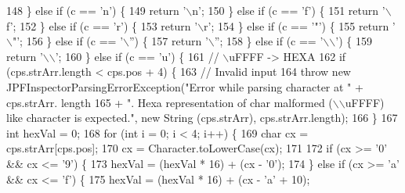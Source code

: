 \begin{DoxyCode}
148       \} \textcolor{keywordflow}{else} \textcolor{keywordflow}{if} (c == \textcolor{charliteral}{'n'}) \{
149         \textcolor{keywordflow}{return} \textcolor{charliteral}{'\(\backslash\)n'};
150       \} \textcolor{keywordflow}{else} \textcolor{keywordflow}{if} (c == \textcolor{charliteral}{'f'}) \{
151         \textcolor{keywordflow}{return} \textcolor{charliteral}{'\(\backslash\)f'};
152       \} \textcolor{keywordflow}{else} \textcolor{keywordflow}{if} (c == \textcolor{charliteral}{'r'}) \{
153         \textcolor{keywordflow}{return} \textcolor{charliteral}{'\(\backslash\)r'};
154       \} \textcolor{keywordflow}{else} \textcolor{keywordflow}{if} (c == \textcolor{charliteral}{'"'}) \{
155         \textcolor{keywordflow}{return} \textcolor{charliteral}{'\(\backslash\)"'};
156       \} \textcolor{keywordflow}{else} \textcolor{keywordflow}{if} (c == \textcolor{charliteral}{'\(\backslash\)''}) \{
157         \textcolor{keywordflow}{return} \textcolor{charliteral}{'\(\backslash\)''};
158       \} \textcolor{keywordflow}{else} \textcolor{keywordflow}{if} (c == \textcolor{charliteral}{'\(\backslash\)\(\backslash\)'}) \{
159         \textcolor{keywordflow}{return} \textcolor{charliteral}{'\(\backslash\)\(\backslash\)'};
160       \} \textcolor{keywordflow}{else} \textcolor{keywordflow}{if} (c == \textcolor{charliteral}{'u'}) \{
161         \textcolor{comment}{// \(\backslash\)uFFFF -> HEXA}
162         \textcolor{keywordflow}{if} (cps.strArr.length < cps.pos + 4) \{
163           \textcolor{comment}{// Invalid input}
164           \textcolor{keywordflow}{throw} \textcolor{keyword}{new} JPFInspectorParsingErrorException(\textcolor{stringliteral}{"Error while parsing character at "} + cps.strArr.
      length
165               + \textcolor{stringliteral}{". Hexa representation of char malformed (\(\backslash\)\(\backslash\)uFFFF) like character is expected."}, \textcolor{keyword}{new} String
      (cps.strArr), cps.strArr.length);
166         \}
167         \textcolor{keywordtype}{int} hexVal = 0;
168         \textcolor{keywordflow}{for} (\textcolor{keywordtype}{int} i = 0; i < 4; i++) \{
169           \textcolor{keywordtype}{char} cx = cps.strArr[cps.pos];
170           cx = Character.toLowerCase(cx);
171 
172           \textcolor{keywordflow}{if} (cx >= \textcolor{charliteral}{'0'} && cx <= \textcolor{charliteral}{'9'}) \{
173             hexVal = (hexVal * 16) + (cx - \textcolor{charliteral}{'0'});
174           \} \textcolor{keywordflow}{else} \textcolor{keywordflow}{if} (cx >= \textcolor{charliteral}{'a'} && cx <= \textcolor{charliteral}{'f'}) \{
175             hexVal = (hexVal * 16) + (cx - \textcolor{charliteral}{'a'} + 10);

\end{DoxyCode}
